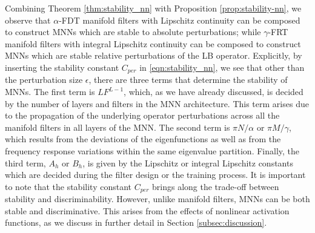 Combining Theorem \ref{thm:stability_nn} with Proposition \ref{prop:stability-nn}, we observe that $\alpha$-FDT manifold filters with Lipschitz continuity can be composed to construct MNNs which are stable to absolute perturbations; while $\gamma$-FRT manifold filters with integral Lipschitz continuity can be composed to construct MNNs which are stable relative perturbations of the LB operator.
Explicitly, by inserting the stability constant $C_{per}$ in \eqref{eqn:stability_nn}, we see that other than the perturbation size $\epsilon$, there are three terms that determine the stability of MNNs. The first term is $LF^{L-1}$, which, as we have already discussed, is decided by the number of layers and filters in the MNN architecture. This term arises due to the propagation of the underlying operator perturbations across all the manifold filters in all layers of the MNN. The second term is $\pi N/\alpha$ or $\pi M/\gamma$, which results from the deviations of the eigenfunctions as well as from the frequency response variations within the same eigenvalue partition. Finally, the third term, $A_h$ or $B_h$, is given by the Lipschitz or integral Lipschitz constants which are decided during the filter design or the training process. It is important to note that the stability constant $C_{per}$ brings along the trade-off between stability and discriminability. However, unlike manifold filters, MNNs can be both stable and discriminative. This arises from the effects of nonlinear activation functions, as we discuss in further detail in Section \ref{subsec:discussion}.



